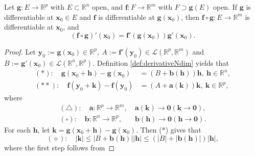 \begin{thm}
  \label{thm:chainRuleOnFuncNdim}
  Let $\mathbf{g}:E\rightarrow \mathbb{R}^{p}$ with
  $E\subset \mathbb{R}^{n}$ open, and
  $\mathbf{f}:F\rightarrow \mathbb{R}^{m}$ with
  $F\supset \mathbf{g}(E)$ open. If $\mathbf{g}$ is differentiable
  at $\mathbf{x}_0\in E$ and $\mathbf{f}$ is differentiable at
  $\mathbf{g}(\mathbf{x}_0)$,
  then $\mathbf{f}\circ \mathbf{g}: E\rightarrow \mathbb{R}^{m}$
  is differentiable at
  $\mathbf{x}_0$, and
  \begin{equation}
    \label{eq:chainRuleOnFuncNdim}
    (\mathbf{f}\circ \mathbf{g})'(\mathbf{x}_0)
    =\mathbf{f}'(\mathbf{g}(\mathbf{x}_0))\mathbf{g}'(\mathbf{x}_0).
  \end{equation}
\end{thm}
\begin{proof}
  Let $\mathbf{y}_{0}:=\mathbf{g}(\mathbf{x}_{0})\in \mathbb{R}^{p},\
  A:=\mathbf{f}'(\mathbf{y}_{0})\in
  \mathcal{L}(\mathbb{R}^{p},\mathbb{R}^{m})$ and
  $B:=\mathbf{g}'(\mathbf{x}_{0})\in
  \mathcal{L}(\mathbb{R}^{n},\mathbb{R}^{p})$.
  Definition \ref{def:derivativeNdim} yields that
  \begin{align*}
    (*):\quad
    \mathbf{g}(\mathbf{x}_{0}+\mathbf{h})-\mathbf{g}(\mathbf{x}_{0})
      &=(B+\mathbf{b}(\mathbf{h}))\mathbf{h},
      \ \mathbf{h}\in \mathbb{R}^{n},\\
    (**):\quad
    \mathbf{f}(\mathbf{y}_{0}+\mathbf{k})-\mathbf{f}(\mathbf{y}_{0})
      &=(A+\mathbf{a}(\mathbf{k}))\mathbf{k},
      \ \mathbf{k}\in \mathbb{R}^{p},
  \end{align*}
  where  
  \begin{align*}
    (\triangle):\quad
    \mathbf{a}:\mathbb{R}^{p}\rightarrow \mathbb{R}^{m},\
    &\mathbf{a}(\mathbf{k})\rightarrow \mathbf{0}
      (\mathbf{k}\rightarrow \mathbf{0}),\\
    (\square):\quad
      \mathbf{b}:\mathbb{R}^{n}\rightarrow \mathbb{R}^{p},\ 
    &\mathbf{b}(\mathbf{h})\rightarrow \mathbf{0}
      (\mathbf{h}\rightarrow \mathbf{0}).
  \end{align*}
  For each $\mathbf{h}$,
  let $\mathbf{k}=\mathbf{g}(\mathbf{x}_{0}+\mathbf{h})
  -\mathbf{g}(\mathbf{x}_{0})$.
  Then ($*$) gives that
  \begin{displaymath}
    (\diamond):\quad
    |\mathbf{k}|\le |B+\mathbf{b}(\mathbf{h})||\mathbf{h}|
    \le (|B|+|\mathbf{b}(\mathbf{h})|)|\mathbf{h}|,
  \end{displaymath}
  where the first step follows from

\end{proof}
